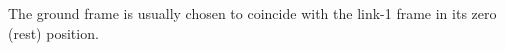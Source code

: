 \documentclass[preview]{standalone}
\begin{document}
\begin{center}
The ground frame is usually chosen to coincide with the link-1 frame in its zero (rest) position.
\end{center}
\end{document}
